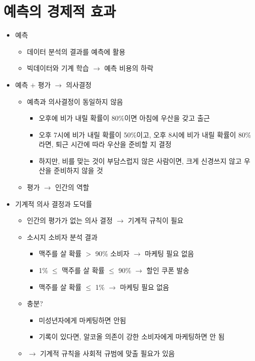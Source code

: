 \section{예측의 경제적 효과}
\begin{itemize}
\item 예측
	\begin{itemize}
	\item 데이터 분석의 결과를 예측에 활용
	\item 빅데이터와 기계 학습 $\rightarrow$ 예측 비용의 하락
	\end{itemize}
\item 예측 $+$ 평가 $\rightarrow$ 의사결정
	\begin{itemize}
	\item 예측과 의사결정이 동일하지 않음
		\begin{itemize}
		\item 오후에 비가 내릴 확률이 80\%이면 아침에 우산을 갖고 출근
		\item 오후 7시에 비가 내릴 확률이 50\%이고, 오후 8시에 비가 내릴 확률이 80\%라면, 퇴근 시간에 따라 우산을 준비할 지 결정
		\item 하지만, 비를 맞는 것이 부담스럽지 않은 사람이면, 크게 신경쓰지 않고 우산을 준비하지 않을 것
		\end{itemize}	
	\item 평가 $\rightarrow$ 인간의 역할
	\end{itemize}	
\item 기계적 의사 결정과 도덕률
	\begin{itemize}
	\item 인간의 평가가 없는 의사 결정 $\rightarrow$ 기계적 규칙이 필요
	\item 소시지 소비자 분석 결과
		\begin{itemize}
		\item 맥주를 살 확률 $>$ 90\% 소비자 $\rightarrow$ 마케팅 필요 없음
		\item 1\% $\leq$ 맥주를 살 확률 $\leq$ 90\% $\rightarrow$ 할인 쿠폰 발송
		\item  맥주를 살 확률 $\leq$ 1\% $\rightarrow$ 마케팅 필요 없음
		\end{itemize}
	\item 충분?
		\begin{itemize}
		\item 미성년자에게 마케팅하면 안됨
		\item 기록이 있다면, 알코올 의존이 강한 소비자에게 마케팅하면 안 됨
		\end{itemize}
	\item $\rightarrow$ 기계적 규칙을 사회적 규범에 맞출 필요가 있음

\end{itemize}
\end{itemize}
